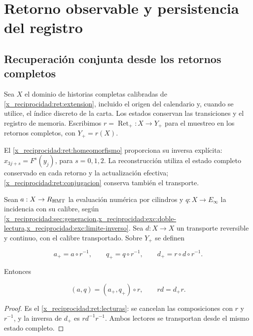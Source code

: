 \chapter{Retorno observable y persistencia del registro}
\label{x_reciprocidad:nuclear:9}
\section{Recuperación conjunta desde los retornos completos}

Sea \(X\) el dominio de historias completas calibradas de
\cref{x_reciprocidad:ret:extension}, incluido el origen del calendario y, cuando se
utilice, el índice discreto de la carta. Los estados conservan las
transiciones y el registro de memoria. Escribimos
\(r=\operatorname{Ret}_+:X\to Y_+\) para el muestreo en los retornos
completos, con \(Y_+=r(X)\).

El \cref{x_reciprocidad:ret:homeomorfismo} proporciona su inversa explícita:
\(x_{3j+s}=F^s(y_j)\), para \(s=0,1,2\). La reconstrucción utiliza
el estado completo conservado en cada retorno y la actualización
efectiva; \eqref{x_reciprocidad:ret:conjugacion} conserva también el transporte.

Sean \(a:X\to R_{\rm HMT}\) la evaluación numérica por cilindros y
\(q:X\to E_\infty\) la incidencia con su calibre, según
\cref{x_reciprocidad:sec:generacion,x_reciprocidad:exc:doble-lectura,x_reciprocidad:exc:limite-inverso}.
Sea \(d:X\to X\) un transporte reversible y continuo, con el calibre
transportado. Sobre \(Y_+\) se definen



\[
a_+=a\circ r^{-1},\qquad q_+=q\circ r^{-1},\qquad d_+=r\circ d\circ r^{-1}.
\]



Entonces



\begin{equation}
\boxed{(a,q)=(a_+,q_+)\circ r,\qquad rd=d_+r.}
\label{x_reciprocidad:nuc09:lecturas}
\end{equation}



\begin{proof}
Es el \cref{x_reciprocidad:ret:lecturas}: se cancelan las composiciones con \(r\)
y \(r^{-1}\), y la inversa de \(d_+\) es \(rd^{-1}r^{-1}\).
Ambos lectores se transportan desde el mismo estado completo.
\end{proof}

